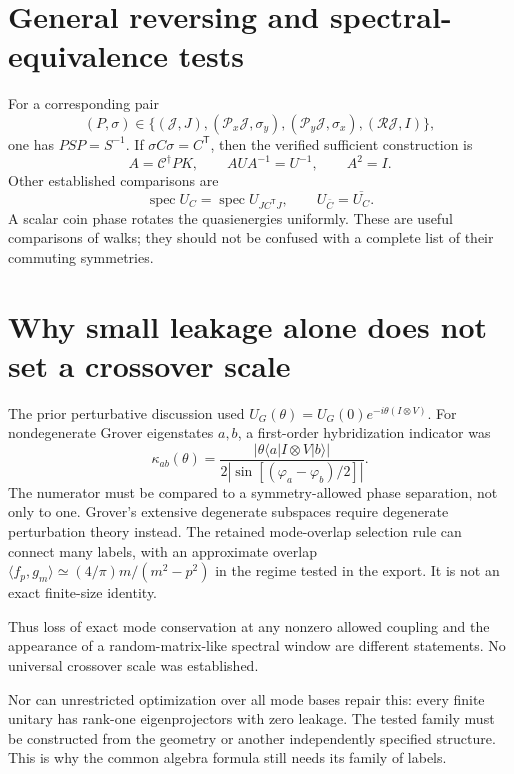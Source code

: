 \documentclass[11pt,a4paper,oneside]{report}
\newcommand{\CC}{\mathcal C}
\newcommand{\Id}{I}
\newcommand{\spec}{\operatorname{spec}}
\numberwithin{equation}{chapter}
\begin{document}
\section{General reversing and spectral-equivalence tests}

For a corresponding pair
\begin{equation}
(P,\sigma)\in
\{(\mathcal J,J),(\mathcal P_x\mathcal J,\sigma_y),
(\mathcal P_y\mathcal J,\sigma_x),(\mathcal R\mathcal J,\Id)\},
\end{equation}
one has \(PSP=S^{-1}\). If \(\sigma C\sigma=C^{\mathsf T}\),
then the verified sufficient construction is
\begin{equation}
A=\CC^\dagger PK,\qquad AUA^{-1}=U^{-1},\qquad A^2=\Id.
\end{equation}
Other established comparisons are
\begin{equation}
\spec U_C=\spec U_{JC^{\mathsf T}J},\qquad
U_{\bar C}=\overline{U_C}.
\end{equation}
A scalar coin phase rotates the quasienergies uniformly. These are
useful comparisons of walks; they should not be confused with a
complete list of their commuting symmetries.

\section{Why small leakage alone does not set a crossover scale}

The prior perturbative discussion used
\(U_G(\theta)=U_G(0)e^{-i\theta(\Id\otimes V)}\).
For nondegenerate Grover eigenstates \(a,b\), a first-order
hybridization indicator was
\begin{equation}
\kappa_{ab}(\theta)=
\frac{|\theta\langle a|\Id\otimes V|b\rangle|}
{2|\sin[(\varphi_a-\varphi_b)/2]|}.
\end{equation}
The numerator must be compared to a symmetry-allowed phase separation,
not only to one. Grover's extensive degenerate subspaces require
degenerate perturbation theory instead. The retained mode-overlap
selection rule can connect many labels, with an approximate overlap
\(\langle f_p,g_m\rangle\simeq(4/\pi)m/(m^2-p^2)\) in the regime
tested in the export. It is not an exact finite-size identity.

Thus loss of exact mode conservation at any nonzero allowed coupling
and the appearance of a random-matrix-like spectral window are
different statements. No universal crossover scale was established.

Nor can unrestricted optimization over all mode bases repair this:
every finite unitary has rank-one eigenprojectors with zero leakage.
The tested family must be constructed from the geometry or another
independently specified structure. This is why the common algebra
formula still needs its family of labels.
\end{document}
